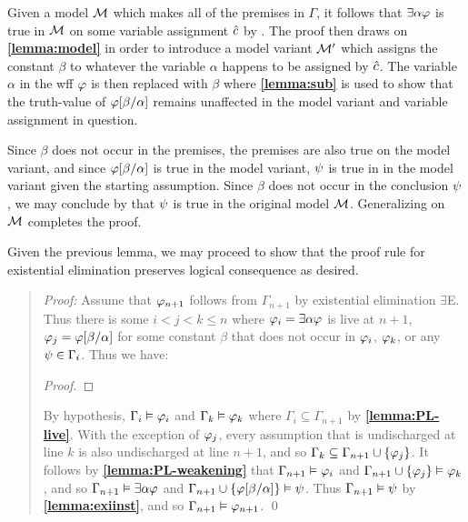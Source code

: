 Given a model $\mathcal{M}$ which makes all of the premises in $\Gamma$, it follows that $\exists \alpha\varphi$ is true in $\mathcal{M}$ on some variable assignment $\hat{c}$ by .
The proof then draws on \textbf{\ref{lemma:model}} in order to introduce a model variant $\mathcal{M}'$ which assigns the constant $\beta$ to whatever the variable $\alpha$ happens to be assigned by $\hat{c}$.
The variable $\alpha$ in the wff $\varphi$ is then replaced with $\beta$ where \textbf{\ref{lemma:sub}} is used to show that the truth-value of $\varphi[\beta/\alpha]$ remains unaffected in the model variant and variable assignment in question.

Since $\beta$ does not occur in the premises, the premises are also true on the model variant, and since $\varphi[\beta/\alpha]$ is true in the model variant, $\psi$ is true in in the model variant given the starting assumption.
Since $\beta$ does not occur in the conclusion $\psi$, we may conclude by  that $\psi$ is true in the original model $\mathcal{M}$. 
Generalizing on $\mathcal{M}$ completes the proof. 

Given the previous lemma, we may proceed to show that the proof rule for existential elimination preserves logical consequence as desired.





\begin{quote} 
  \textit{Proof:} Assume that $\varphi_{n+1}$ follows from $\Gamma_{n+1}$ by existential elimination $\exists$E.
  Thus there is some $i<j<k\leq n$ where $\varphi_i=\exists \alpha\varphi$ is live at $n+1$, $\varphi_j=\varphi[\beta/\alpha]$ for some constant $\beta$ that does not occur in $\varphi_i$, $\varphi_k$, or any $\psi\in\Gamma_i$.
  Thus we have:

  \begin{proof}
    \open	
       
    \close
     
  \end{proof}

  By hypothesis, $\Gamma_i\vDash\varphi_i$ and $\Gamma_k\vDash\varphi_k$ where $\Gamma_i\subseteq \Gamma_{n+1}$ by \textbf{\ref{lemma:PL-live}}.
  With the exception of $\varphi_j$, every assumption that is undischarged at line $k$ is also undischarged at line $n+1$, and so $\Gamma_k\subseteq\Gamma_{n+1}\cup\lbrace\varphi_j\rbrace$.
  It follows by \textbf{\ref{lemma:PL-weakening}} that $\Gamma_{n+1} \vDash \varphi_i$ and $\Gamma_{n+1}\cup\lbrace\varphi_j\rbrace \vDash \varphi_k$, and so $\Gamma_{n+1} \vDash \exists \alpha\varphi$ and $\Gamma_{n+1}\cup\lbrace\varphi[\beta/\alpha]\rbrace \vDash \psi$.
  Thus $\Gamma_{n+1}\vDash\psi$ by \textbf{\ref{lemma:exiinst}}, and so $\Gamma_{n+1}\vDash\varphi_{n+1}$.
  \qed
\end{quote}


